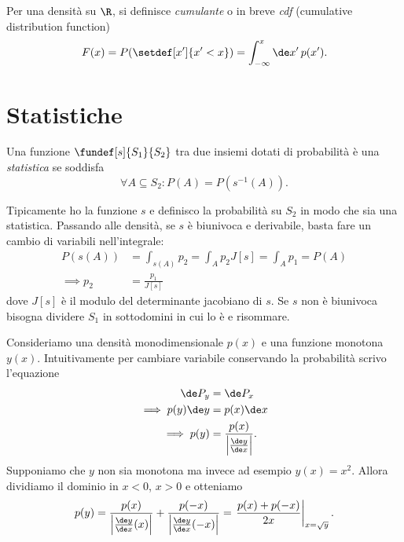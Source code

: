 \begin{definition}[Cumulante]
	Per una densità su $\R$, si definisce \emph{cumulante} o in breve \emph{cdf} (cumulative distribution function)
	\begin{equation*}
		F(x) = P(\setdef[x']{x'<x}) = \int_{-\infty}^x \de x'\,p(x').
	\end{equation*}
\end{definition}

\section{Statistiche}

\begin{definition}[Statistica]
	Una funzione $\fundef[s]{S_1}{S_2}$ tra due insiemi dotati di probabilità è una \emph{statistica} se soddisfa
	\begin{equation*}
		\forall A\subseteq S_2 : P(A) = P(s^{-1}(A)).
	\end{equation*}
\end{definition}

Tipicamente ho la funzione $s$ e definisco la probabilità su $S_2$ in modo che sia una statistica.
Passando alle densità, se $s$ è biunivoca e derivabile, basta fare un cambio di variabili nell'integrale:
\begin{align*}
	P(s(A)) &= \int_{s(A)} p_2 = \int_A p_2 J[s] = \int_A p_1 = P(A) \\
	\implies p_2 &= \frac{p_1}{J[s]}
\end{align*}
dove $J[s]$ è il modulo del determinante jacobiano di $s$.
Se $s$ non è biunivoca bisogna dividere $S_1$ in sottodomini in cui lo è e risommare.

\begin{example}
	\label{th:stat1d}
	Consideriamo una densità monodimensionale $p(x)$ e una funzione monotona $y(x)$.
	Intuitivamente per cambiare variabile conservando la probabilità scrivo l'equazione
	\begin{align*}
		\de P_y &= \de P_x \\
		\implies p(y)\de y &= p(x) \de x \\
		\implies p(y) &= \frac{p(x)}{\left|\frac{\de y}{\de x}\right|}.
	\end{align*}
	Supponiamo che $y$ non sia monotona ma invece ad esempio $y(x)=x^2$.
	Allora dividiamo il dominio in $x<0$, $x>0$ e otteniamo
	\begin{equation*}
		p(y) = \frac{p(x)}{\left|\frac{\de y}{\de x}(x)\right|} + \frac{p(-x)}{\left|\frac{\de y}{\de x}(-x)\right|} =
		\left.\frac{p(x)+p(-x)}{2x}\right|_{x=\sqrt y}.
	\end{equation*}
\end{example}


